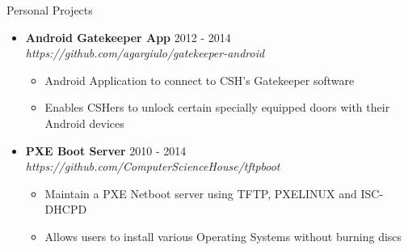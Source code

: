 \documentclass[10pt,oneside]{article}
\newenvironment{ressection}[1]{
	\vspace{3pt}
	{\fontfamily{ppl}\selectfont\Large#1}
	\begin{itemize}
	\vspace{2pt}
}{
	\end{itemize}
}
\newcommand{\ressubitem}[1]{
	\vspace{-1pt}
	\item \begin{flushleft} #1 \end{flushleft}
}
\newcommand{\resaltitem}[3]{
	\vspace{-3pt}
	\item
	\textbf{#1} \hfill #2 \\
	\textit{#3}
}
\newenvironment{resaltsec}[3]{
	\resaltitem{#1}{#2}{#3}
	\vspace{-1pt}
	\begin{itemize}
}{
	\end{itemize}
}
\begin{document}
\begin{ressection}{Personal Projects}


	\begin{resaltsec}{Android Gatekeeper App}{2012 - 2014}{https://github.com/agargiulo/gatekeeper-android}
		\ressubitem{Android Application to connect to CSH's Gatekeeper software}
		\ressubitem{Enables CSHers to unlock certain specially equipped doors with their Android devices}
	\end{resaltsec}

	\begin{resaltsec}{PXE Boot Server}{2010 - 2014}{https://github.com/ComputerScienceHouse/tftpboot}
		\ressubitem{Maintain a PXE Netboot server using TFTP, PXELINUX and ISC-DHCPD}
		\ressubitem{Allows users to install various Operating Systems without burning discs}
	\end{resaltsec}

\end{ressection}
\end{document}
